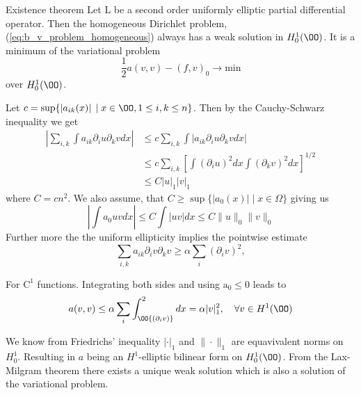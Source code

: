 \begin{thmx}{Existence theorem}
    Let L be a second order uniformly elliptic partial differential operator. Then the homogeneous Dirichlet problem,
     (\ref{eq:b_v_problem_homogeneous}) always has a weak solution in $H_0^1(\OO)$. It is a minimum of the variational problem
    \begin{equation}
        \frac{1}{2} a(v,v) - {(f, v)}_0 \rightarrow \text{min}
    \end{equation}
    over $H_0^1(\OO)$.
    \label{thm:existence_hom_dirichlet}
\end{thmx}

\begin{bev}
    Let $c = \sup\{\left| a_{ik}(x) \right| \; | \; x \in \OO, 1 \leq i,k \leq n\}$. Then by the Cauchy-Schwarz inequality we get
    \begin{align}
        \left| \sum_{i,k} \int a_{ik} \partial_i u \partial_k v dx \right| &\leq c \sum_{i,k} \int  \left| a_{ik} \partial_i u \partial_k v dx\right|\\
        &\leq c \sum_{i,k} {\left[ \int {\left( \partial_i u \right)}^2 dx \int {\left( \partial_k v \right)}^2 dx  \right]}^{1/2} \\
        &\leq C {\left| u \right|}_1 {\left| v \right|}_1
    \end{align}
    where $C=cn^2$. 
    We also assume, that $C\geq \sup\{|a_0(x)| \; | \; x\in \Omega\}$ giving us
    \[
        \left|\int a_0 u v dx \right| \leq C \int |u v| dx \leq C \|u\|_0 \|v\|_0      
    \]
    Further more the the uniform ellipticity implies the pointwise estimate %
    \[
        \sum_{i,k} a_{ik} \partial_i v \partial_k v \geq \alpha \sum_i {\left( \partial_i v \right)}^2,
    \]

    For $\text{C}^1$ functions. Integrating both sides and using $\text{a}_0 \leq 0$ leads to %
    \begin{equation}
        a(v,v) \leq \alpha \sum_i \int_\OO {\left(\partial_i v\right)}^2 dx = \alpha |v|^2_1, \quad \forall v \in H^1(\OO)
    \end{equation}

    We know from Friedrichs' inequality $|\cdot|_1$ and $\| \cdot \|_1$ are equavivalent norms on $H_0^1$. Resulting in $a$ being an $H^1$-elliptic bilinear form on $H_0^1(\OO)$.
    From the Lax-Milgram theorem there exists a unique weak solution which is also a solution of the variational problem.
\end{bev}